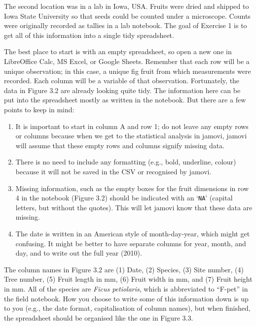 \documentclass[
  openany]{krantz}
\providecommand{\tightlist}{%
  \setlength{\itemsep}{0pt}\setlength{\parskip}{0pt}}
\begin{document}
The second location was in a lab in Iowa, USA.
Fruits were dried and shipped to Iowa State University so that seeds could be counted under a microscope.
Counts were originally recorded as tallies in a lab notebook.
The goal of Exercise 1 is to get all of this information into a single tidy spreadsheet.

The best place to start is with an empty spreadsheet, so open a new one in LibreOffice Calc, MS Excel, or Google Sheets.
Remember that each row will be a unique observation; in this case, a unique fig fruit from which measurements were recorded.
Each column will be a variable of that observation.
Fortunately, the data in Figure 3.2 are already looking quite tidy.
The information here can be put into the spreadsheet mostly as written in the notebook.
But there are a few points to keep in mind:

\begin{enumerate}
\def\labelenumi{\arabic{enumi}.}
\tightlist
\item
  It is important to start in column A and row 1; do not leave any empty rows or columns because when we get to the statistical analysis in jamovi, jamovi will assume that these empty rows and columns signify missing data.
\item
  There is no need to include any formatting (e.g., bold, underline, colour) because it will not be saved in the CSV or recognised by jamovi.
\item
  Missing information, such as the empty boxes for the fruit dimensions in row 4 in the notebook (Figure 3.2) should be indicated with an `\texttt{NA}' (capital letters, but without the quotes). This will let jamovi know that these data are missing.
\item
  The date is written in an American style of month-day-year, which might get confusing. It might be better to have separate columns for year, month, and day, and to write out the full year (2010).
\end{enumerate}

The column names in Figure 3.2 are (1) Date, (2) Species, (3) Site number, (4) Tree number, (5) Fruit length in mm, (6) Fruit width in mm, and (7) Fruit height in mm.
All of the species are \emph{Ficus petiolaris}, which is abbreviated to ``F-pet'' in the field notebook.
How you choose to write some of this information down is up to you (e.g., the date format, capitalisation of column names), but when finished, the spreadsheet should be organised like the one in Figure 3.3.
\end{document}
